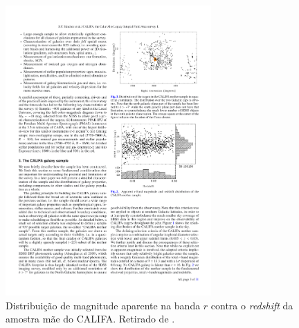 \begin{figure}
	\includegraphics[width=0.7\textwidth]{figuras/CALIFASample}
	\caption[Distribuição de magnitude $r$ contra {\em redshift} da amostra mãe
	do CALIFA] {Distribuição de magnitude aparente na banda $r$ contra o {\em
	redshift} da amostra mãe do CALIFA. Retirado de \citet{Sanchez2012}.}
	\label{fig:CALIFASample}
\end{figure}

